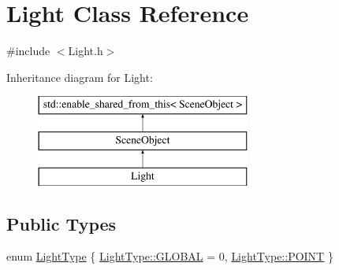 \hypertarget{class_light}{}\section{Light Class Reference}
\label{class_light}


{\ttfamily \#include $<$Light.\+h$>$}

Inheritance diagram for Light\+:\begin{figure}[H]
\begin{center}
\leavevmode
\includegraphics[height=3.000000cm]{class_light}
\end{center}
\end{figure}
\subsection*{Public Types}
\begin{DoxyCompactItemize}
\item 
enum \hyperlink{class_light_a661d9480e01af8b1612860b9630ef5f8}{Light\+Type} \{ \hyperlink{class_light_a661d9480e01af8b1612860b9630ef5f8a6eecfba72d12922ee1dead07a0ef3334}{Light\+Type\+::\+G\+L\+O\+B\+A\+L} = 0, 
\hyperlink{class_light_a661d9480e01af8b1612860b9630ef5f8aaebdbcb765394d25d6a604589a890f82}{Light\+Type\+::\+P\+O\+I\+N\+T}
 \}
\end{DoxyCompactItemize}
